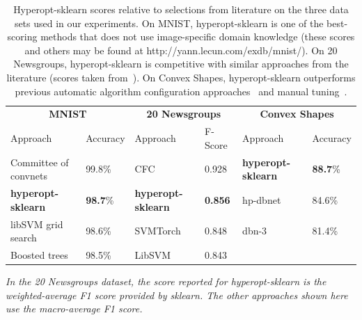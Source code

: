 \documentclass[wcp]{jmlr}
\begin{document}
\begin{table}
  \begin{threeparttable}
    \caption{
        Hyperopt-sklearn scores relative to selections from literature on the three data sets used in our experiments.
        On MNIST, hyperopt-sklearn is one of the best-scoring methods that does not use image-specific domain knowledge (these scores and others may be found at http://yann.lecun.com/exdb/mnist/).
	On 20 Newsgroups, hyperopt-sklearn is competitive with similar approaches from the literature (scores taken from~\citet{guan2009class}).
        On Convex Shapes, hyperopt-sklearn outperforms previous automatic algorithm configuration approaches~\citep{eggensperger+etal:2013} and manual tuning~\citep{larochelle+etal:2007}.
    }
    \label{tbl:acc}
    \centering
    \small
    \begin{tabular}{llllll}
        \hline
        \multicolumn{2}{c}{\textbf{MNIST}} & \multicolumn{2}{c}{\textbf{20 Newsgroups}} & \multicolumn{2}{c}{\textbf{Convex Shapes}}  \\
        Approach & Accuracy  & Approach & F-Score & Approach & Accuracy\\
        \hline
	Committee of convnets & 99.8\%                & CFC & 0.928 & \textbf{hyperopt-sklearn} & \textbf{88.7}\%\\
	\textbf{hyperopt-sklearn} & \textbf{98.7}\%   & \textbf{hyperopt-sklearn} & \textbf{0.856} & hp-dbnet & 84.6\% \\
        libSVM grid search & 98.6\%                   & SVMTorch & 0.848 & dbn-3 & 81.4\%\\
        Boosted trees & 98.5\%                        & LibSVM & 0.843 &  &  \\
    \end{tabular}
    \begin{tablenotes}
      \footnotesize
      \item
	      \textit{In the 20 Newsgroups dataset, the score reported for hyperopt-sklearn is the weighted-average F1 score provided by sklearn. The other approaches shown here use the macro-average F1 score.} 
    \end{tablenotes}
  \end{threeparttable}
\end{table}
\end{document}
